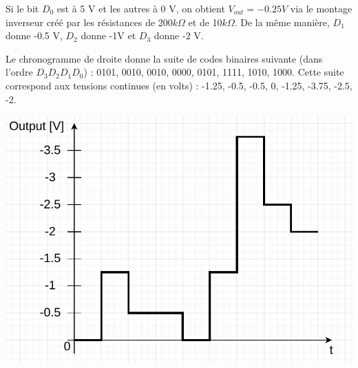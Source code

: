 \documentclass{../../template/tp}
\begin{document}
{
	Si le bit $D_0$ est à 5 V et les autres à 0 V, on obtient $V_{out} = -0.25 V$ via le montage inverseur créé par les résistances de 200$k\Omega$ et de 10$k\Omega$. De la même manière, $D_1$ donne -0.5 V, $D_2$ donne -1V et $D_3$ donne -2 V.

	Le chronogramme de droite donne la suite de codes binaires suivante (dans l'ordre $D_3D_2D_1D_0$) : 0101, 0010, 0010, 0000, 0101, 1111, 1010, 1000.
	Cette suite correspond aux tensions continues (en volts) : -1.25, -0.5, -0.5, 0, -1.25, -3.75, -2.5, -2.
	
	\begin{center}
		\includegraphics[width=.6\textwidth]{DAC-conv-corrige.pdf}
	\end{center}
}
\end{document}
